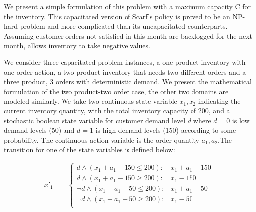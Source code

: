 We present a simple formulation of this problem with a maximum capacity C for the inventory. This capacitated version of Scarf's policy is proved to be an NP-hard problem \cite{bitran} and more complicated than its uncapacitated counterparts. Assuming customer orders not satisfied in this month are backlogged for the next month, allows inventory to take negative values. 

We consider three capacitated problem instances, a one product inventory with one order action, a two product inventory that needs two different orders and a three product, 3 orders with deterministic demand.
We present the mathematical formulation of the two product-two order case, the other two domains are modeled similarly. We take two continuous state variable $x_1,x_2$ indicating the current inventory quantity, with the total inventory capacity of 200, and a stochastic boolean state variable for customer demand level $d$ where $d=0$ is low demand levels (50) and $d=1$ is high demand levels (150) according to some probability. The continuous action variable is the order quantity $a_1,a_2$.The transition for one of the state variables is defined below:
 
{\footnotesize
\begin{align*}
x'_1 & = \begin{cases}
d \wedge (x_1 + a_1 - 150 \leq 200) : & x_1 + a_1 - 150 \\
d \wedge (x_1 + a_1 - 150 \geq 200) : & x_1 - 150 \\
\neg d \wedge (x_1 + a_1 - 50 \leq 200): & x_1 + a_1 - 50 \\
\neg d \wedge (x_1 + a_1 - 50 \geq 200): & x_1 - 50 \\
\end{cases}
\end{align*}}

